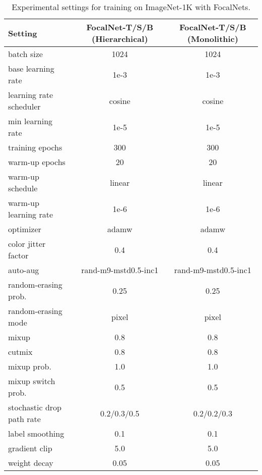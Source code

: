 \documentclass{article}
\begin{document}
\begin{table}[h]
    \centering
    \footnotesize
    \begin{tabular}{l | c c}
    \toprule
        Setting & FocalNet-T/S/B (Hierarchical) &
        FocalNet-T/S/B (Monolithic) \\
        \midrule
        batch size          &  1024 & 1024   \\
        base learning rate  &  1e-3 & 1e-3   \\
        learning rate scheduler & cosine & cosine \\
        min learning rate   & 1e-5   & 1e-5 \\
        training epochs     &  300  & 300    \\
        warm-up epochs      &  20   & 20     \\
        warm-up schedule    & linear & linear \\
        warm-up learning rate & 1e-6  & 1e-6 \\
        optimizer          & adamw   & adamw \\
        \midrule
        color jitter factor & 0.4   & 0.4 \\
        auto-aug          & rand-m9-mstd0.5-inc1 & rand-m9-mstd0.5-inc1 \\
        random-erasing prob. & 0.25 & 0.25 \\
        random-erasing mode  & pixel & pixel \\
        mixup           & 0.8   & 0.8 \\
        cutmix          & 0.8   & 0.8 \\
        mixup prob.             & 1.0   & 1.0 \\
        mixup switch prob.      & 0.5   & 0.5 \\
        \midrule
        stochastic drop path rate & 0.2/0.3/0.5 & 0.2/0.2/0.3 \\
        label smoothing        & 0.1  & 0.1 \\
        gradient clip          & 5.0  & 5.0 \\
        weight decay           & 0.05 & 0.05 \\
        
    \bottomrule
    \end{tabular}
    \caption{Experimental settings for training on ImageNet-1K with FocalNets.}
    \label{tab:config4imagenet1k}
\end{table}
\end{document}
